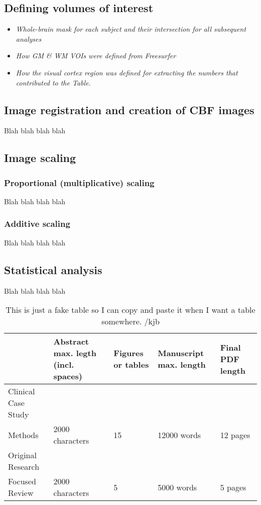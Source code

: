 \subsection{Defining volumes of interest}
\begin{itemize}
\item \textit{Whole-brain mask for each subject and their intersection for all subsequent analyses}
\item \textit{How GM & WM VOIs were defined from Freesurfer}
\item \textit{How the visual cortex region was defined for extracting the numbers that contributed to the Table.}
\end{itemize}

\subsection{Image registration and creation of CBF images}
Blah blah blah blah

\subsection{Image scaling}
\subsubsection{Proportional (multiplicative) scaling}
Blah blah blah blah
\subsubsection{Additive scaling}
Blah blah blah blah

\subsection{Statistical analysis}
Blah blah blah blah

\midrule
\begin{table}
\caption{This is just a fake table so I can copy and paste it when I want a table somewhere. /kjb\label{Tab:01}}
{\begin{tabular}{lllll}
 & Abstract max. legth (incl. spaces) & Figures or tables & Manuscript max. length & Final PDF length\\\midrule
Clinical Case Study & & & &\\
Methods & 2000 characters  & 15 & 12000 words & 12 pages\\
Original Research & & & &\\
Focused Review & 2000 characters & 5 & 5000 words & 5 pages\\
\end{tabular}}{}
\end{table}

